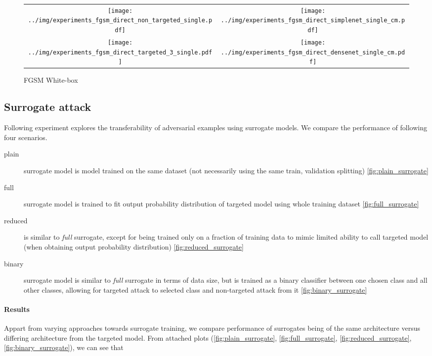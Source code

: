 \begin{figure}
\centering
\begin{tabular}{@{}cc@{}}
    \texttt{[image: ../img/experiments\_fgsm\_direct\_non\_targeted\_single.pdf]} &
    \texttt{[image: ../img/experiments\_fgsm\_direct\_simplenet\_single\_cm.pdf]} \\
    \texttt{[image: ../img/experiments\_fgsm\_direct\_targeted\_3\_single.pdf]}   &
    \texttt{[image: ../img/experiments\_fgsm\_direct\_densenet\_single\_cm.pdf]}  \\
\end{tabular}
\caption{FGSM White-box}
\label{fig:fgsm_white_box}
\end{figure}

\subsection{Surrogate attack}
Following experiment explores the transferability of adversarial examples using surrogate models. We compare the performance of following four scenarios.

\begin{description}
\item[plain] surrogate model is model trained on the same dataset (not necessarily using the same train, validation splitting) \ref{fig:plain_surrogate}
\item[full] surrogate model is trained to fit output probability distribution of targeted model using whole training dataset \ref{fig:full_surrogate}
\item[reduced] is similar to \textit{full} surrogate, except for being trained only on a fraction of training data to mimic limited ability to call targeted model (when obtaining output probability distribution) \ref{fig:reduced_surrogate}
\item[binary] surrogate model is similar to \textit{full} surrogate in terms of data size, but is trained as a binary classifier between one chosen class and all other classes, allowing for targeted attack to selected class and non-targeted attack from it \ref{fig:binary_surrogate}
\end{description}

\paragraph{Results}
Appart from varying approaches towards surrogate training, we compare performance of surrogates being of the same architecture versus differing architecture from the targeted model.
From attached plots (\ref{fig:plain_surrogate}, \ref{fig:full_surrogate}, \ref{fig:reduced_surrogate}, \ref{fig:binary_surrogate}), we can see that

